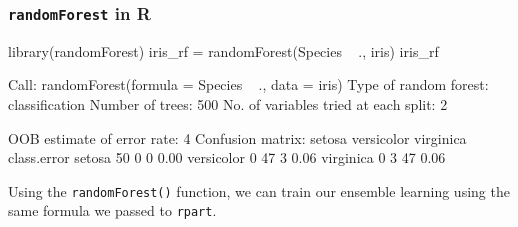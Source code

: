 \documentclass[a4paper]{article}\usepackage[]{graphicx}\usepackage[]{xcolor}
\begin{document}
\subsubsection{\lstinline|randomForest| in R}
\begin{Schunk}
\begin{Sinput}
library(randomForest)
iris_rf = randomForest(Species ~ ., iris)
iris_rf
\end{Sinput}
\begin{Soutput}

Call:
 randomForest(formula = Species ~ ., data = iris) 
               Type of random forest: classification
                     Number of trees: 500
No. of variables tried at each split: 2

        OOB estimate of  error rate: 4%
Confusion matrix:
           setosa versicolor virginica class.error
setosa         50          0         0        0.00
versicolor      0         47         3        0.06
virginica       0          3        47        0.06
\end{Soutput}
\end{Schunk}
Using the \lstinline|randomForest()| function, we can train our ensemble learning using the same formula we passed to \lstinline|rpart|.
\end{document}
